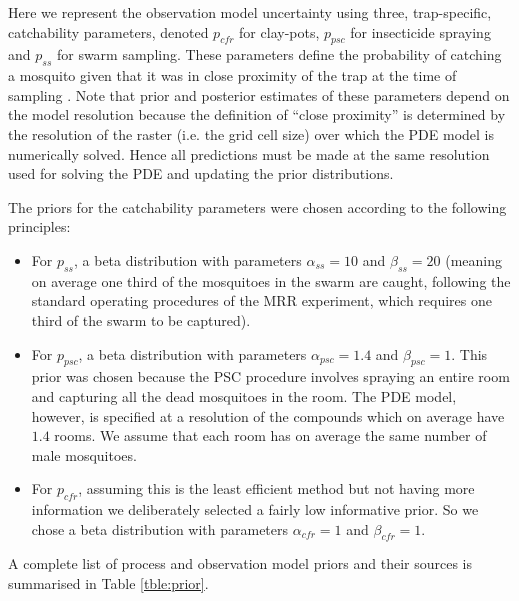\documentclass[]{bmcart}
\begin{document}
Here we represent the observation model uncertainty using three, trap-specific, catchability parameters, denoted $p_{cfr}$ for clay-pots, $p_{psc}$ for insecticide spraying and $p_{ss}$ for swarm sampling. These parameters define the probability of catching a mosquito given that it was in close proximity of the trap at the time of sampling \cite{Martin2005a}. Note that prior and posterior estimates of these parameters depend on the model resolution because the definition of ``close proximity'' is determined by the resolution of the raster (i.e. the grid cell size) over which the PDE model is numerically solved. Hence all predictions must be made at the same resolution used for solving the PDE and updating the prior distributions. 

The priors for the catchability parameters were chosen according to the following principles:
\begin{itemize}
\item For $p_{ss}$, a beta distribution with parameters $\alpha_{ss} = 10$ and $\beta_{ss} = 20$ (meaning on average one third of the mosquitoes in the swarm are caught, following the standard operating procedures of the MRR experiment, which requires one third of the swarm to be captured).
\item For $p_{psc}$, a beta distribution with parameters $\alpha_{psc} = 1.4$ and $\beta_{psc} = 1$. This prior was chosen because the PSC procedure involves spraying an entire room and capturing all the dead mosquitoes in the room. The PDE model, however, is specified at a resolution of the compounds which on average have $1.4$ rooms. We assume that each room has on average the same number of male mosquitoes.
\item For $p_{cfr}$, assuming this is the least efficient method but not having more information we deliberately selected a fairly low informative prior. So we chose a beta distribution with parameters $\alpha_{cfr} = 1$ and $\beta_{cfr} = 1$.
\end{itemize} 
A complete list of process and observation model priors and their sources is summarised in Table \ref{tble:prior}.
\end{document}
